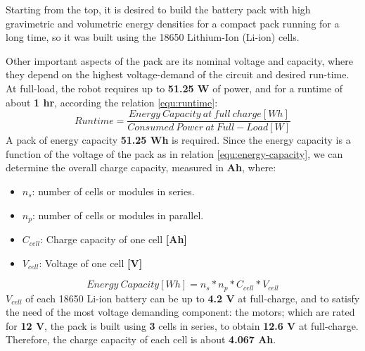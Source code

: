 Starting from the top, it is desired to build the battery pack with high gravimetric and volumetric energy densities for a compact pack running for a long time, so it was built using the 18650 Lithium-Ion (Li-ion) cells. \cite{cellComp}


Other important aspects of the pack are its nominal voltage and capacity, where they depend on the highest voltage-demand of the circuit and desired run-time. At full-load, the robot requires up to \textbf{51.25 W} of power, and for a runtime of about \textbf{1 hr}, according the relation \ref{equ:runtime}:
\begin{equation}
    Runtime = \frac{Energy\ Capacity\ at\ full\ charge[Wh]}{Consumed\ Power\ at\ Full-Load[W]}
    \label{equ:runtime}
\end{equation}
A pack of energy capacity \textbf{51.25 Wh} is required. Since the energy capacity is a function of the voltage of the pack as in relation \ref{equ:energy-capacity}, we can determine the overall charge capacity, measured in \textbf{Ah}, where:
\begin{itemize}
    \item $n_s$: number of cells or modules in series.
    \item $n_p$: number of cells or modules in parallel.
    \item $C_{cell}$: Charge capacity of one cell \textbf{[Ah]}
    \item $V_{cell}$: Voltage of one cell \textbf{[V]}
\end{itemize}
\begin{equation}
    Energy\ Capacity[Wh] = n_s * n_p * C_{cell} * V_{cell}
    \label{equ:energy-capacity}
\end{equation} %
\textbf{$V_{cell}$} of each 18650 Li-ion battery can be up to \textbf{4.2 V} at full-charge, and to satisfy the need of the most voltage demanding component: the motors; which are rated for \textbf{12 V}, the pack is built using \textbf{3} cells in series, to obtain \textbf{12.6 V} at full-charge. Therefore, the charge capacity of each cell is about \textbf{4.067 Ah}. 

